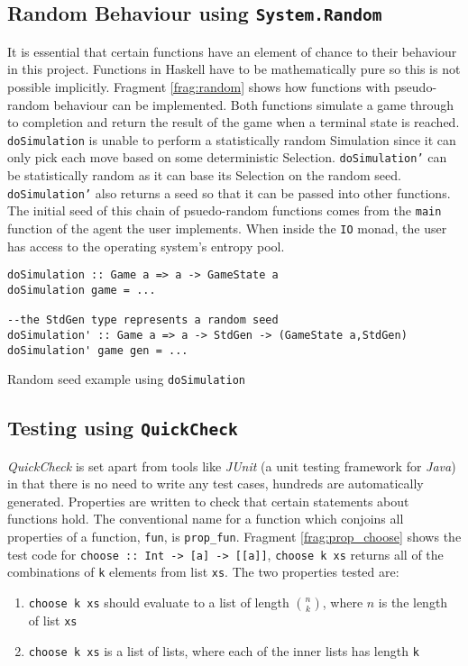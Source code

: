 \subsection{Random Behaviour using \texttt{System.Random}\label{sec:rand}}
It is essential that certain functions have an element of chance to their behaviour in this project. Functions in {Haskell} have to be mathematically pure so this is not possible implicitly. Fragment \ref{frag:random} shows how functions with pseudo-random behaviour can be implemented. Both functions simulate a game through to completion and return the result of the game when a terminal state is reached. \texttt{doSimulation} is unable to perform a statistically random Simulation since it can only pick each move based on some deterministic Selection. \texttt{doSimulation'} can be statistically random as it can base its Selection on the random seed. \texttt{doSimulation'} also returns a seed so that it can be passed into other functions. The initial seed of this chain of psuedo-random functions comes from the \verb|main| function of the agent the user implements. When inside the \verb|IO| {monad}, the user has access to the operating system's entropy pool.
\begin{fragment}
\begin{lstlisting}
doSimulation :: Game a => a -> GameState a
doSimulation game = ...

--the StdGen type represents a random seed
doSimulation' :: Game a => a -> StdGen -> (GameState a,StdGen)
doSimulation' game gen = ...
\end{lstlisting}
\caption{Random seed example using \texttt{doSimulation}}
\label{frag:random}
\end{fragment}

\subsection{Testing using \texttt{QuickCheck}\label{sec:testing}}
\label{sec:choose}
\textit{QuickCheck} is set apart from tools like \emph{JUnit} (a unit testing framework for \emph{Java}) in that there is no need to write any test cases, hundreds are automatically generated. Properties are written to check that certain statements about functions hold. The conventional name for a function which conjoins all properties of a function, \texttt{fun}, is \verb|prop_fun|. Fragment \ref{frag:prop_choose} shows the test code for \verb|choose :: Int -> [a] -> [[a]]|, \verb|choose k xs| returns all of the combinations of \texttt{k} elements from list \texttt{xs}. The two properties tested are: 
\begin {enumerate}
\item \verb|choose k xs| should evaluate to a list of length $\binom{n}{k}$, where $n$ is the length of list \verb|xs|
\item \verb|choose k xs| is a list of lists, where each of the inner lists has length \verb|k|
\end {enumerate}

